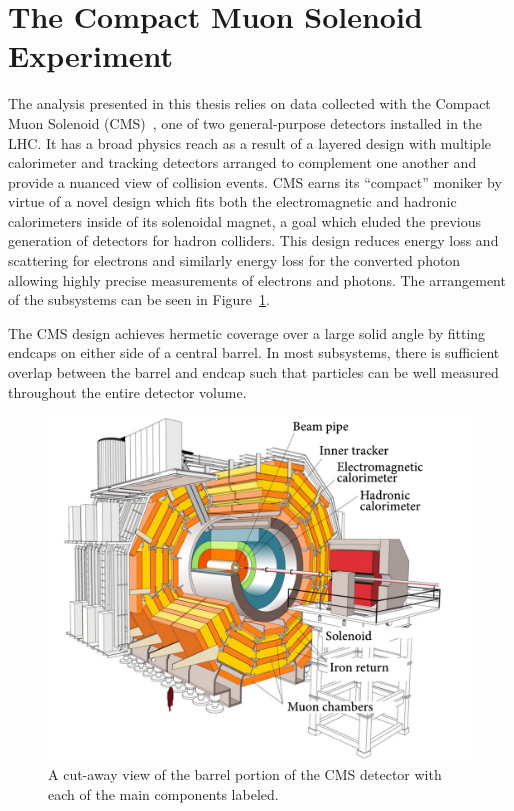 \section{The Compact Muon Solenoid Experiment}
The analysis presented in this thesis relies on data collected with the Compact Muon Solenoid (CMS)~\cite{CMSPaper}, one of two general-purpose detectors installed in the LHC.  It has a broad physics reach as a result of a layered design with multiple calorimeter and tracking detectors arranged to complement one another and provide a nuanced view of collision events.  CMS earns its ``compact'' moniker by virtue of a novel design which fits both the electromagnetic and hadronic calorimeters inside of its solenoidal magnet, a goal which eluded the previous generation of detectors for hadron colliders. 
This design reduces energy loss and scattering for electrons and similarly energy loss for the converted photon allowing highly precise measurements of electrons and photons.
The arrangement of the subsystems can be seen in Figure~\ref{fig:cms-cutaway}.

The CMS design achieves hermetic coverage over a large solid angle by fitting endcaps on either side of a central barrel.  In most subsystems, there is sufficient overlap between the barrel and endcap such that particles can be well measured throughout the entire detector volume.

\begin{figure}[htbp]
\centering
\includegraphics[width=4.5in]{figures/cms-cutaway}
\caption{A cut-away view of the barrel portion of the CMS detector with each of the main components labeled.}
\label{fig:cms-cutaway}
\end{figure}

